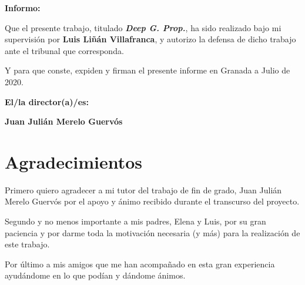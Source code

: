 \textbf{Informo:}

\vspace{0.5cm}

Que el presente trabajo, titulado \textit{\textbf{Deep G. Prop.}}, ha sido
realizado bajo mi supervisión por \textbf{Luis Liñán Villafranca}, y autorizo
la defensa de dicho trabajo ante el tribunal que corresponda.

\vspace{0.5cm}

Y para que conste, expiden y firman el presente informe en Granada a Julio de
2020.

\vspace{1cm}

\textbf{El/la director(a)/es:}

\vspace{5cm}

\noindent\textbf{Juan Julián Merelo Guervós}

\chapter*{Agradecimientos}

Primero quiero agradecer a mi tutor del trabajo de fin de grado, Juan Julián
Merelo Guervós por el apoyo y ánimo recibido durante el transcurso del
proyecto.

Segundo y no menos importante a mis padres, Elena y Luis, por su gran paciencia
y por darme toda la motivación necesaria (y más) para la realización de este
trabajo.

Por último a mis amigos que me han acompañado en esta gran experiencia
ayudándome en lo que podían y dándome ánimos.
